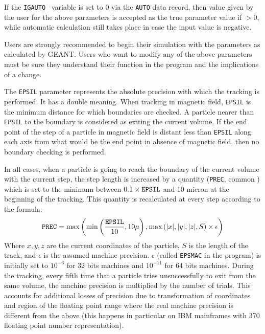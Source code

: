 If the {\tt IGAUTO } variable is set to 0 via the {\tt AUTO} data record, 
then value given by the user for the above parameters is accepted as the
true parameter value if $>0$, while automatic calculation still takes place
in case the input value is negative.

Users are strongly recommended to begin their simulation with the parameters
as calculated by GEANT. Users who want to modify any of the above
parameters must be sure they understand their function in the program and
the implications of a change.

The {\tt EPSIL} parameter represents the absolute precision with which the
tracking is performed. It has a double meaning. When tracking in magnetic
field, {\tt EPSIL} is the minimum distance for which boundaries are
checked. A particle nearer than {\tt EPSIL} to the boundary is considered
as exiting the current volume. If the end point of the step of a particle in
magnetic field is distant less than {\tt EPSIL} along each axis 
from what would be the end point in absence of magnetic field, then no boundary 
checking is performed. 

In all cases, when a particle is going to reach the
boundary of the current volume with the current step, the step length is 
increased by a quantity ({\tt PREC}, common ) which is set to the 
minimum between $0.1 \times {\tt EPSIL}$
and 10 micron at the beginning of the tracking. This quantity is recalculated
at every step according to the formula:
\begin{equation}
{\tt PREC} = \max \left ( \min \left (\frac{\tt EPSIL}{10}, 10 \mu \right ) ,
\max \left ( | x |, | y |, | z |, S \right ) \times \epsilon \right )
\end{equation}
Where $x,y,z$ are the current coordinates of the particle, $S$ is the length
of the track, and $\epsilon$ is the assumed machine precision.
$\epsilon$ (called {\tt EPSMAC} in the program) is initially set to
$10^{-6}$ for 32 bits machines and $10^{-11}$ for 64 bits machines.
During the tracking, every fifth time that a particle tries unsuccessfully
to exit from the same volume, the machine precision is multiplied by the
number of trials. This accounts for additional losses of precision due to
transformation of coordinates and region of the floating point range where
the real machine precision is different from the above (this happens 
in particular on IBM mainframes with 370 floating point number representation).
%
 
 

